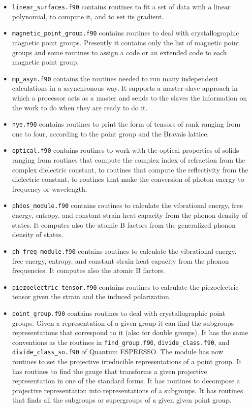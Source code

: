 \documentclass[12pt,a4paper,twoside]{report}
\def\qe{{\sc Quantum ESPRESSO}}
\begin{document}
\begin{itemize}
\item
\texttt{linear\_surfaces.f90} contains routines to fit a set of data
with a linear polynomial, to compute it, and to set its gradient.  

\item
\texttt{magnetic\_point\_group.f90} contains routines to deal with 
crystallographic
magnetic point groups. Presently it contains only the list of magnetic
point groups and some routines to assign a code or an extended code to each
magnetic point group.

\item
\texttt{mp\_asyn.f90} contains the routines needed to run many 
independent calculations in a asynchronous way. It supports a master-slave
approach in which a processor acts as a master and sends to the slaves
the information on the work to do when they are ready to do it.

\item
\texttt{nye.f90} contains routines to print the form of tensors of
rank ranging from one to four, according to the point group and the
Bravais lattice.

\item
\texttt{optical.f90} contains routines to work with the optical properties
of solids ranging from routines that compute the complex index of refraction
from the complex dielectric constant, to routines that compute the
reflectivity from the dielectric constant, to routines that make
the conversion of photon energy to frequency or wavelength.

\item
\texttt{phdos\_module.f90} contains routines to calculate the vibrational
energy, free energy, entropy, and constant strain heat capacity from the
phonon density of states. It computes also the atomic B factors from the
generalized phonon density of states.

\item
\texttt{ph\_freq\_module.f90} contains routines to calculate the vibrational
energy, free energy, entropy, and constant strain heat capacity from the
phonon frequencies. It computes also the atomic B factors.

\item
\texttt{piezoelectric\_tensor.f90} contains routines to calculate the
piezoelectric tensor given the strain and the induced polarization.

\item
\texttt{point\_group.f90} contains routines to deal with crystallographic
point groups. Given a representation of a given group it can find 
the subgroups representations that correspond to it (also for
double groups). It has the same conventions as the routines 
in \texttt{find\_group.f90}, \texttt{divide\_class.f90}, and 
\texttt{divide\_class\_so.f90} of \qe. The module has now routines to
set the projective irreducible representations of a point group.
It has routines to find the gauge that transforms a given projective
representation in one of the standard forms. It has routines to decompose
a projective representation into representations of a subgroups.
It has routines that finds all the subgroups or supergroups of a given given
point group.


\end{itemize}
\end{document}
